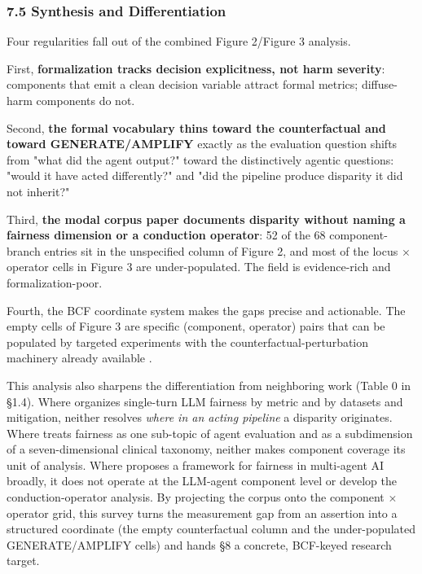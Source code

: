 \documentclass[10pt]{article}
\begin{document}
\subsubsection*{7.5 Synthesis and Differentiation}

Four regularities fall out of the combined Figure 2/Figure 3 analysis.

First, \textbf{formalization tracks decision explicitness, not harm severity}: components that emit a clean decision variable attract formal metrics; diffuse-harm components do not.

Second, \textbf{the formal vocabulary thins toward the counterfactual and toward GENERATE/AMPLIFY} exactly as the evaluation question shifts from "what did the agent output?" toward the distinctively agentic questions: "would it have acted differently?" and "did the pipeline produce disparity it did not inherit?"

Third, \textbf{the modal corpus paper documents disparity without naming a fairness dimension or a conduction operator}: 52 of the 68 component-branch entries sit in the unspecified column of Figure 2, and most of the locus $\times$ operator cells in Figure 3 are under-populated. The field is evidence-rich and formalization-poor.

Fourth, the BCF coordinate system makes the gaps precise and actionable. The empty cells of Figure 3 are specific (component, operator) pairs that can be populated by targeted experiments with the counterfactual-perturbation machinery already available \cite{parziale2025systematic,mayilvaghanan2026counterfactual,basu2026names}.

This analysis also sharpens the differentiation from neighboring work (Table 0 in \S{}1.4). Where \cite{chu2024fairness} organizes single-turn LLM fairness by metric and \cite{gallegos2024bias} by datasets and mitigation, neither resolves \emph{where in an acting pipeline} a disparity originates. Where \cite{mohammadi2025evaluation} treats fairness as one sub-topic of agent evaluation and \cite{vatsal2026agentic} as a subdimension of a seven-dimensional clinical taxonomy, neither makes component coverage its unit of analysis. Where \cite{ranjan2025fairness} proposes a framework for fairness in multi-agent AI broadly, it does not operate at the LLM-agent component level or develop the conduction-operator analysis. By projecting the corpus onto the component $\times$ operator grid, this survey turns the measurement gap from an assertion into a structured coordinate (the empty counterfactual column and the under-populated GENERATE/AMPLIFY cells) and hands \S{}8 a concrete, BCF-keyed research target.
\end{document}
